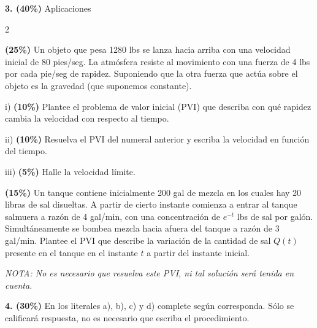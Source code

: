\documentclass[11pt]{article}
\begin{document}
\noindent\textbf{3. (40\%)} Aplicaciones

\begin{multicols}{2}

\begin{opciones}
\item[a)] \textbf{(25\%)} Un objeto que pesa 1280 lbs se lanza hacia arriba con una velocidad inicial de 80 pies/seg. La atmósfera resiste al movimiento con una fuerza de 4 lbs por cada pie/seg de rapidez. Suponiendo que la otra fuerza que actúa sobre el objeto es la gravedad (que suponemos constante).

i) \textbf{(10\%)} Plantee el problema de valor inicial (PVI) que describa con qué rapidez cambia la velocidad con respecto al tiempo.

ii) \textbf{(10\%)} Resuelva el PVI del numeral anterior y escriba la velocidad en función del tiempo.

iii) \textbf{(5\%)} Halle la velocidad límite.
\end{opciones}

\columnbreak

\begin{opciones}
\item[b)] \textbf{(15\%)} Un tanque contiene inicialmente 200 gal de mezcla en los cuales hay 20 libras de sal disueltas. A partir de cierto instante comienza a entrar al tanque salmuera a razón de 4 gal/min, con una concentración de $e^{-t}$ lbs de sal por galón. Simultáneamente se bombea mezcla hacia afuera del tanque a razón de 3 gal/min. Plantee el PVI que describe la variación de la cantidad de sal $Q(t)$ presente en el tanque en el instante $t$ a partir del instante inicial.

\textit{NOTA: No es necesario que resuelva este PVI, ni tal solución será tenida en cuenta.}
\end{opciones}

\end{multicols}

\noindent\textbf{4. (30\%)} En los literales a), b), c) y d) complete según corresponda. Sólo se calificará respuesta, no es necesario que escriba el procedimiento.
\end{document}
